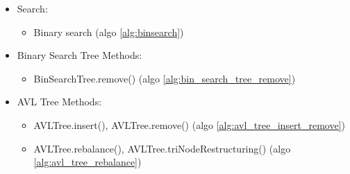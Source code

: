 {{{		}
	}{ %
		\begin{itemize}[nosep]
			\item Search:
			\begin{itemize}[nosep]
				\item Binary search (algo \ref{alg:binsearch})
			\end{itemize}
			\item Binary Search Tree Methods:
			\begin{itemize}[nosep]
				\item BinSearchTree.remove() (algo \ref{alg:bin_search_tree_remove})
			\end{itemize}
			\item AVL Tree Methods:
			\begin{itemize}[nosep]
				\item AVLTree.insert(), AVLTree.remove() (algo \ref{alg:avl_tree_insert_remove})
				\item AVLTree.rebalance(), AVLTree.triNodeRestructuring() (algo \ref{alg:avl_tree_rebalance})
			\end{itemize}
		\end{itemize}
	}{} %
}
